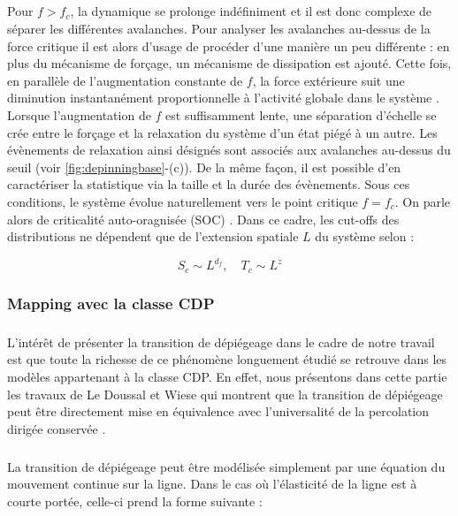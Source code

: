 \subparagraph{}Pour $f>f_c$, la dynamique se prolonge indéfiniment et il est donc complexe de séparer les différentes avalanches. Pour analyser les avalanches au-dessus de la force critique il est alors d'usage de procéder d'une manière un peu différente : en plus du mécanisme de forçage, un mécanisme de dissipation est ajouté. Cette fois, en parallèle de l'augmentation constante de $f$, la force extérieure suit une diminution instantanément proportionnelle à l'activité globale dans le système \cite{le_priol_long_range_2020, wiese_theory_2022}. Lorsque l'augmentation de $f$ est suffisamment lente, une séparation d'échelle se crée entre le forçage et la relaxation du système d'un état piégé à un autre. Les évènements de relaxation ainsi désignés sont associés aux avalanches au-dessus du seuil (voir \autoref{fig:depinningbase}-(c)). De la même façon, il est possible d'en caractériser la statistique via la taille et la durée des évènements. Sous ces conditions, le système évolue naturellement vers le point critique $f=f_c$. On parle alors de criticalité auto-oragnisée (SOC) \cite{bak_self_organized_1988, turcotte_self_organized_1999, lubeck_universal_2004}. Dans ce cadre, les cut-offs des distributions ne dépendent que de l'extension spatiale $L$ du système selon :

\begin{equation}
	S_c \sim L^{d_f}, \quad T_c \sim L^{z}
\end{equation}

\subsubsection{Mapping avec la classe CDP}

\label{sec:mapping_dep_cdp}

\subparagraph{}L'intérêt de présenter la transition de dépiégeage dans le cadre de notre travail est que toute la richesse de ce phénomène longuement étudié se retrouve dans les modèles appartenant à la classe CDP. En effet, nous présentons dans cette partie les travaux de Le Doussal et Wiese qui montrent que la transition de dépiégeage peut être directement mise en équivalence avec l'universalité de la percolation dirigée conservée \cite{le_doussal_exact_2015, wiese_hyperuniformity_2024}.

\subparagraph{}La transition de dépiégeage peut être modélisée simplement par une équation du mouvement continue sur la ligne. Dans le cas où l'élasticité de la ligne est à courte portée, celle-ci prend la forme suivante \cite{fisher_collective_1998, wiese_theory_2022} :

